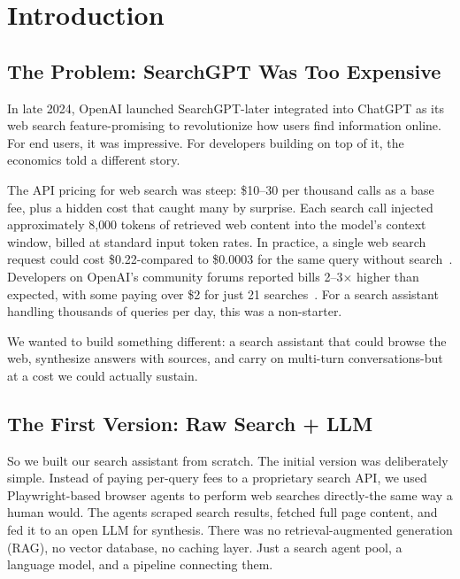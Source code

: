 \documentclass[conference]{IEEEtran}
\begin{document}
\section{Introduction}

\subsection{The Problem: SearchGPT Was Too Expensive}

In late 2024, OpenAI launched SearchGPT-later integrated into ChatGPT as its web search feature-promising to revolutionize how users find information online. For end users, it was impressive. For developers building on top of it, the economics told a different story.

The API pricing for web search was steep: \$10--30 per thousand calls as a base fee, plus a hidden cost that caught many by surprise. Each search call injected approximately 8{,}000 tokens of retrieved web content into the model's context window, billed at standard input token rates. In practice, a single web search request could cost \$0.22-compared to \$0.0003 for the same query without search~\cite{openai_search_pricing}. Developers on OpenAI's community forums reported bills 2--3$\times$ higher than expected, with some paying over \$2 for just 21 searches~\cite{openai_search_billing}. For a search assistant handling thousands of queries per day, this was a non-starter.

We wanted to build something different: a search assistant that could browse the web, synthesize answers with sources, and carry on multi-turn conversations-but at a cost we could actually sustain.

\subsection{The First Version: Raw Search + LLM}

So we built our search assistant from scratch. The initial version was deliberately simple. Instead of paying per-query fees to a proprietary search API, we used Playwright-based browser agents to perform web searches directly-the same way a human would. The agents scraped search results, fetched full page content, and fed it to an open LLM for synthesis. There was no retrieval-augmented generation (RAG), no vector database, no caching layer. Just a search agent pool, a language model, and a pipeline connecting them.
\end{document}
